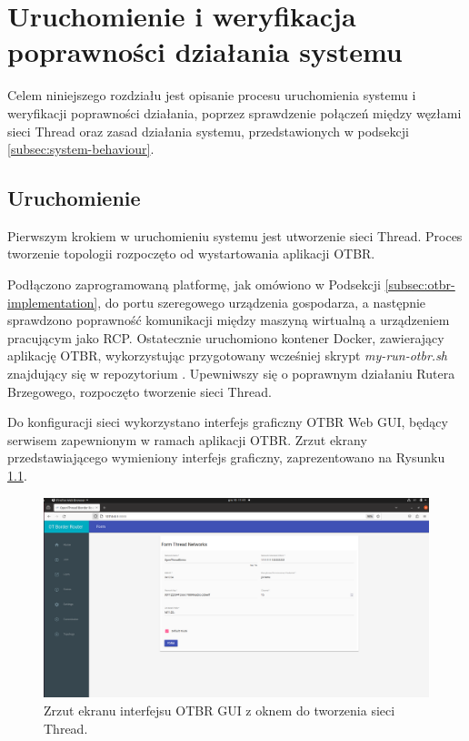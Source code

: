 \chapter{Uruchomienie i weryfikacja poprawności działania systemu}

Celem niniejszego rozdziału jest opisanie procesu uruchomienia systemu i weryfikacji poprawności działania, poprzez sprawdzenie połączeń między węzłami sieci Thread oraz zasad działania systemu, przedstawionych w podsekcji \ref{subsec:system-behaviour}.

\section{Uruchomienie}

Pierwszym krokiem w uruchomieniu systemu jest utworzenie sieci Thread. Proces tworzenie topologii rozpoczęto od wystartowania aplikacji OTBR.

Podłączono zaprogramowaną platformę, jak omówiono w Podsekcji \ref{subsec:otbr-implementation}, do portu szeregowego urządzenia gospodarza, a następnie sprawdzono poprawność komunikacji między maszyną wirtualną a urządzeniem pracującym jako RCP. Ostatecznie uruchomiono kontener Docker, zawierający aplikację OTBR, wykorzystując przygotowany wcześniej skrypt \textit{my-run-otbr.sh} znajdujący się w repozytorium \cite{project-repo}. Upewniwszy się o poprawnym działaniu Rutera Brzegowego, rozpoczęto tworzenie sieci Thread.
    
Do konfiguracji sieci wykorzystano interfejs graficzny OTBR Web GUI, będący serwisem zapewnionym w ramach aplikacji OTBR. Zrzut ekrany przedstawiającego wymieniony interfejs graficzny, zaprezentowano na Rysunku \ref{fig:otbr-web-gui}.

\begin{figure}[H]
    \centering
    \includegraphics[width=0.8\linewidth]{graphics/screenshots/OTBR-web-gui.png}
    \caption{Zrzut ekranu interfejsu OTBR GUI z oknem do tworzenia sieci Thread.}
    \label{fig:otbr-web-gui}
\end{figure}

